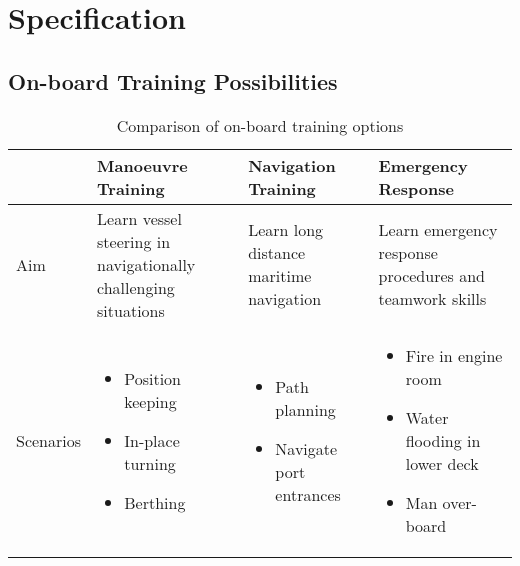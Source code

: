 \chapter{Specification}

\section{On-board Training Possibilities}
\begin{table}[h]
\centering
\caption{Comparison of on-board training options}
\label{tab:trainingoptions}
\begin{tabular}{@{}p{2.3cm}|p{3.4cm}|p{3.4cm}|p{3.4cm}|@{}}
\toprule
\multicolumn{1}{c|}{ } & \multicolumn{1}{P{3cm}|}{\textbf{Manoeuvre Training}} & \multicolumn{1}{P{3cm}|}{\textbf{Navigation Training}} & \multicolumn{1}{P{2.5cm}|}{\textbf{Emergency Response}} \\ 
\hline
Aim & Learn vessel steering in navigationally challenging situations & Learn long distance maritime navigation & Learn emergency response procedures and teamwork skills \\
\hline
Scenarios &
\vspace{-2mm} \begin{itemize}[leftmargin=*,topsep=0pt,partopsep=0pt,align=left,itemsep=0.05cm]
\renewcommand{\labelitemi}{\tiny\listsymb} 
\item Position keeping  
\item In-place turning
\item Berthing  
\end{itemize}
&\vspace{-2mm} \begin{itemize}[leftmargin=*,topsep=0pt,partopsep=0pt,align=left,itemsep=0cm]
\renewcommand{\labelitemi}{\tiny\listsymb} 
\item Path planning 
\item Navigate port entrances
\end{itemize}
& \vspace{-2mm} \begin{itemize}[leftmargin=*,topsep=0pt,partopsep=0pt,align=left,itemsep=0cm]
\renewcommand{\labelitemi}{\tiny\listsymb} 
\item Fire in engine room 
\item Water flooding in lower deck
\item Man over-board
\end{itemize} \vspace{-\baselineskip} \\

\end{tabular}
\end{table}
